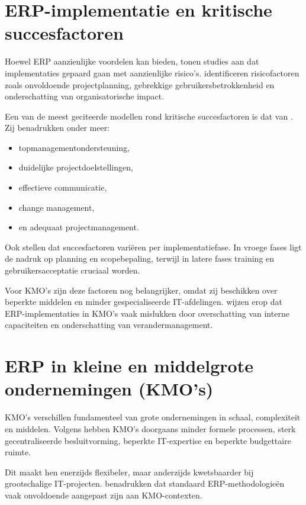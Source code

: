 \section{ERP-implementatie en kritische succesfactoren}

Hoewel ERP aanzienlijke voordelen kan bieden, tonen studies aan dat implementaties gepaard gaan met aanzienlijke risico’s. \textcite{Aloini2007} identificeren risicofactoren zoals onvoldoende projectplanning, gebrekkige gebruikersbetrokkenheid en onderschatting van organisatorische impact.

Een van de meest geciteerde modellen rond kritische succesfactoren is dat van \textcite{Nah2001}. Zij benadrukken onder meer:
\begin{itemize}
    \item topmanagementondersteuning,
    \item duidelijke projectdoelstellingen,
    \item effectieve communicatie,
    \item change management,
    \item en adequaat projectmanagement.
\end{itemize}

Ook \textcite{Somers2001} stellen dat succesfactoren variëren per implementatiefase. In vroege fases ligt de nadruk op planning en scopebepaling, terwijl in latere fases training en gebruikersacceptatie cruciaal worden.

Voor KMO’s zijn deze factoren nog belangrijker, omdat zij beschikken over beperkte middelen en minder gespecialiseerde IT-afdelingen. \textcite{Haddara2011} wijzen erop dat ERP-implementaties in KMO’s vaak mislukken door overschatting van interne capaciteiten en onderschatting van verandermanagement.

\section{ERP in kleine en middelgrote ondernemingen (KMO’s)}

KMO’s verschillen fundamenteel van grote ondernemingen in schaal, complexiteit en middelen. Volgens \textcite{Snider2009} hebben KMO’s doorgaans minder formele processen, sterk gecentraliseerde besluitvorming, beperkte IT-expertise en beperkte budgettaire ruimte.

Dit maakt hen enerzijds flexibeler, maar anderzijds kwetsbaarder bij grootschalige IT-projecten. \textcite{Haddara2011} benadrukken dat standaard ERP-methodologieën vaak onvoldoende aangepast zijn aan KMO-contexten.

